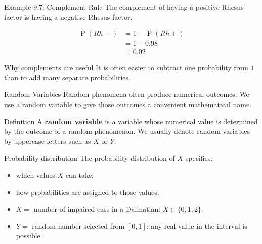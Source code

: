 \documentclass[aspectratio=169]{beamer}
\newcommand{\prob}[1]{\operatorname{P}\!\left(#1\right)}
\begin{document}
\begin{frame}{Example 9.7: Complement Rule}
The complement of having a positive Rhesus factor is having a negative Rhesus factor.

\begin{align*}
\prob{Rh-}
&=1-\prob{Rh+}\\
&=1-0.98\\
&=\boxed{0.02}
\end{align*}

\begin{block}{Why complements are useful}
It is often easier to subtract one probability from $1$ than to add many separate probabilities.
\end{block}
\end{frame}

\begin{frame}{Random Variables}
Random phenomena often produce numerical outcomes. We use a random variable to give those outcomes a convenient mathematical name.

\begin{block}{Definition}
A \textbf{random variable} is a variable whose numerical value is determined by the outcome of a random phenomenon. We usually denote random variables by uppercase letters such as $X$ or $Y$.
\end{block}

\begin{block}{Probability distribution}
The probability distribution of $X$ specifies:
\begin{itemize}
  \item which values $X$ can take;
  \item how probabilities are assigned to those values.
\end{itemize}
\end{block}

\begin{itemize}
  \item $X=$ number of impaired ears in a Dalmatian: $X\in\{0,1,2\}$.
  \item $Y=$ random number selected from $[0,1]$: any real value in the interval is possible.
\end{itemize}
\end{frame}
\end{document}

